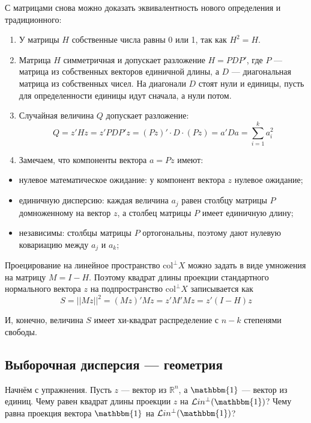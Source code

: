 \documentclass[11pt,russian,]{article}
\providecommand{\tightlist}{%
  \setlength{\itemsep}{0pt}\setlength{\parskip}{0pt}}
\newcommand{\RR}{\mathbb{R}}
\renewcommand{\Rn}{\RR^n}
\newcommand{\1}{\mathbbm{1}}
\newcommand{\Lin}{\mathcal{L}in}
\newcommand{\Linp}{\Lin^{\perp}}
\newcommand{\col}{\mathcal{col}}
\newcommand{\colp}{\col^{\perp}}
\renewcommand{\col}{\mathrm{col}}
\begin{document}
С матрицами снова можно доказать эквивалентность нового определения и
традиционного:

\begin{enumerate}
\def\labelenumi{\arabic{enumi}.}
\item
  У матрицы \(H\) собственные числа равны 0 или 1, так как \(H^2=H\).
\item
  Матрица \(H\) симметричная и допускает разложение \(H = PDP'\), где
  \(P\) --- матрица из собственных векторов единичной длины, а \(D\) ---
  диагональная матрица из собственных чисел. На диагонали \(D\) стоят
  нули и единицы, пусть для определенности единицы идут сначала, а нули
  потом.
\item
  Случайная величина \(Q\) допускает разложение: \[
  Q=z'Hz=z'PDP'z=(Pz)'\cdot D\cdot (Pz) = a'Da=\sum_{i=1}^k a_i^2
  \]
\item
  Замечаем, что компоненты вектора \(a=Pz\) имеют:
\end{enumerate}

\begin{itemize}
\tightlist
\item
  нулевое математическое ожидание: у компонент вектора \(z\) нулевое
  ожидание;
\item
  единичную дисперсию: каждая величина \(a_j\) равен столбцу матрицы
  \(P\) домноженному на вектор \(z\), а столбец матрицы \(P\) имеет
  единичную длину;
\item
  независимы: столбцы матрицы \(P\) ортогональны, поэтому дают нулевую
  ковариацию между \(a_j\) и \(a_k\);
\end{itemize}

Проецирование на линейное пространство \(\colp X\) можно задать в виде
умножения на матрицу \(M = I - H\). Поэтому квадрат длины проекции
стандартного нормального вектора \(z\) на подпространство \(\colp X\)
записывается как \[
S = ||Mz||^2 = (Mz)'Mz=z'M'Mz=z'(I-H)z
\]

И, конечно, величина \(S\) имеет хи-квадрат распределение с \(n-k\)
степенями свободы.

\subsection{Выборочная дисперсия --- геометрия}\label{--}

Начнём с упражнения. Пусть \(z\) --- вектор из \(\Rn\), а \(\1\) ---
вектор из единиц. Чему равен квадрат длины проекции \(z\) на
\(\Linp(\1)\)? Чему равна проекция вектора \(\1\) на \(\Linp(\1)\)?
\end{document}
